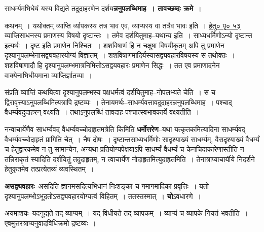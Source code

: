 \documentclass[article,12pt,a4paper]{memoir}
\begin{document}
	  \pstart साधर्म्यमभिधेयं यस्य विद्यते तदुदाहरणेन दर्शय\textbf{न्ननुपलब्धिमाह । तावच्छब्दः क्रमे} ।  \leavevmode{} 
	  
	कथनम् । यथोक्तम् व्याप्ति र्व्यापकस्य तत्र भाव एव, व्याप्यस्य वा तत्रैव भावः इति । \href{http://sarit.indology.info/?cref=hb.1.4}{हेतु० पृ० ५३} व्याप्तिसाधनस्य प्रमाणस्य विषयो दृष्टान्तः । तमेव दर्शयितुमाह--यथान्य इति । साध्यधर्मिणोऽन्यो दृष्टान्त इत्यर्थः । दृष्ट इति प्रमाणेन निश्चितः । शशविषाणं हि न चक्षुषा विषयीकृतम् अपि तु प्रमाणेन दृश्यानुपलम्भेनासद्व्यवहारयोग्यं विज्ञातम् । शशविषाणमादिर्यस्यासद्व्यवहारविषयस्य स तथोक्तः । शशविषाणादौ हि दृश्यानुपलम्भमात्रनिमित्तोऽसद्वयवहारः प्रमाणेन सिद्धः । तत एव प्रमाणादनेन वाक्येनाभिधीयमाना व्याप्तिर्ज्ञातव्या ।  
	  
	संप्रति व्याप्तिं कथयित्वा दृश्यानुपलम्भस्य पक्षधर्मत्वं दर्शयितुमाह--नोपलभ्यते चेति । स च द्विरावृत्त्याऽनुपलब्धिमित्यत्रापि द्रष्टव्यः । तेनायमर्थः--साधर्म्यवत्तावदुदाहरन्ननुपलब्धिमाह । पश्चाद् वैधर्म्यवदुदाहरन् वक्ष्यति । तथाऽनुपलब्धिं तावदाह पश्चात्स्वभावकार्ये वक्ष्यतीति ।
	\pend
      

	  \pstart नन्वाचार्येणैव साधर्म्यवद् वैधर्म्यवच्चोदाहृतमत्रेति किमिति \textbf{धर्मोत्तरेण}--यथा यत्कृतकमित्यादिना साधर्म्यवद् वैधर्म्यवच्चोदाहृतं प्रागिति चेत् । नैष दोषः । दृष्टान्तसाध्यधर्मिणोः सादृश्याख्यं साधर्म्यम्, वैसदृश्याख्यं वैधर्म्यं च हेतुद्वारकमेव न तु सामान्येन, अन्यथा प्रतियोग्यपेक्षयाऽपि साधर्म्यं वैधर्म्यं च केनचिदाकारेणास्तीति न तन्निराकृतं स्यादिति दर्शयितुं तदुदाहृतम्, न त्वाचार्येण नोदाहृतमित्युदाहृतमिति । तेनात्राप्याचार्यीये निदर्शने हेतुकृतमेव तत्प्रत्येतव्यं व्यवस्थितम् ।
	\pend
      

	  \pstart \textbf{असद्व्यवहारः}--असदिति ज्ञानमसदित्यभिधानं निःशङ्का च गमागमादिका प्रवृत्तिः । यतो दृश्यानुपलम्भोऽभूदतोऽसद्व्यवहारयोग्यत्वं विहितम् । ततस्तस्मात् । \textbf{चो}ऽवधारणे ।
	\pend
      

	  \pstart अयमाशयः--यदनूद्यते तद् व्याप्यम् । यद् विधीयते तद् व्यापकम् । व्याप्यं च व्यापके नियतं भवतीति । एवमुत्तरत्राप्यनुवादविधिक्रमो द्रष्टव्यः ।
	\pend
      
\end{document}
